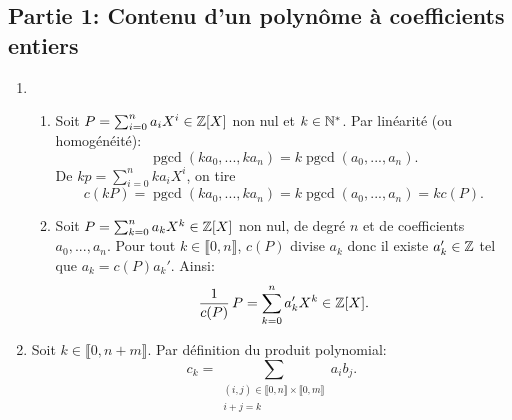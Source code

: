 
\subsection*{Partie 1: Contenu d'un polynôme à coefficients entiers}
\begin{enumerate}
\item 
   \begin{enumerate}
   \item Soit $P = \sum_{i=0}^{n}a_{i}X^{i}\in \mathbb{Z}[X]$ non nul et $k\in \mathbb{N}^{*}$. Par linéarité (ou homogénéité):
\[
\operatorname{pgcd}(ka_{0},...,ka_{n}) = k\operatorname{pgcd}(a_{0},...,a_{n}). 
\]
De $kp = \sum_{i=0}^{n}ka_{i}X^{i}$, on tire
\[
   c(kP) = \operatorname{pgcd}(ka_{0},...,ka_{n}) = k\operatorname{pgcd}(a_{0},...,a_{n}) = kc(P).
\]
    \item Soit $P= \sum_{k=0}^{n}a_{k}X^{k}\in \mathbb{Z}[X]$ non nul, de degré $n$ et de coefficients $a_{0},...,a_{n}$.\newline 
    Pour tout $k\in \llbracket 0, n\rrbracket$, $c(P)$ divise $a_{k}$ donc il existe $a_{k}'\in \mathbb{Z}$ tel que $a_{k} = c(P)a_{k}'$. Ainsi:
\[
\frac{1}{c(P)}\,P = \sum_{k=0}^{n}a_{k}'X^{k}\in \mathbb{Z}[X]. 
\]
    \end{enumerate}

\item Soit $k\in \llbracket 0, n+m\rrbracket$. Par définition du produit polynomial:
\[
c_{k} = \sum_{\substack{(i,j)\in \llbracket 0, n\rrbracket \times \llbracket 0, m\rrbracket \\ i+j = k}}a_{i}b_{j}. 
\]


\end{enumerate}
